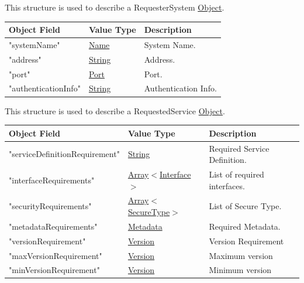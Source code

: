 \documentclass[a4paper]{arrowhead}
\newcommand{\mref}[1]{{\textcolor{ArrowheadPurple}{\hyperref[sec:model:#1]{#1}}}}
\newcommand{\pref}[1]{{\textcolor{ArrowheadGrey}{\hyperref[sec:model:primitives:#1]{#1}}}}
\begin{document}
This structure is used to describe a RequesterSystem \pref{Object}. 

\begin{table}[ht!]
\begin{tabularx}{\textwidth}{| p{5cm} | p{6cm} | X |} \hline
\rowcolor{gray!33} Object Field & Value Type                      & Description \\ \hline
"systemName"         & \pref{Name}     & System Name. \\ \hline
"address"            & \pref{String}   & Address. \\ \hline
"port"               & \pref{Port}     & Port. \\ \hline
"authenticationInfo" & \pref{String}   & Authentication Info. \\ \hline

\end{tabularx}
\end{table}


This structure is used to describe a RequestedService \pref{Object}. 

\begin{table}[ht!]
\begin{tabularx}{\textwidth}{| p{5cm} | p{6cm} | X |} \hline
\rowcolor{gray!33} Object Field & Value Type                      & Description \\ \hline
"serviceDefinitionRequirement"         & \pref{String}     & Required Service Definition. \\ \hline
"interfaceRequirements"            & \pref{Array}$<$\mref{Interface}$>$   & List of required interfaces. \\ \hline
"securityRequirements"               & \pref{Array}$<$\mref{SecureType}$>$     & List of Secure Type. \\ \hline
"metadataRequirements" & \pref{Metadata}   & Required Metadata. \\ \hline
"versionRequirement"   & \pref{Version} & Version Requirement \\ \hline
"maxVersionRequirement" & \pref{Version} & Maximum version \\ \hline
"minVersionRequirement" & \pref{Version} & Minimum version \\ \hline


\end{tabularx}
\end{table}

\end{document}
